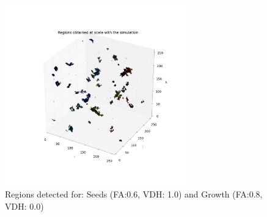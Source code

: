 \documentclass[12pt]{article}
\begin{document}
\begin{figure}[ht]
\begin{center}
\includegraphics[width=0.7\textwidth]{groups/firstimplementation/regions_3D_129.png} %
\caption{Regions detected for: Seeds (FA:0.6, VDH: 1.0) and Growth (FA:0.8, VDH: 0.0) }
\label{fg:first_3D_all}
\end{center}
\end{figure}
\FloatBarrier
\end{document}
